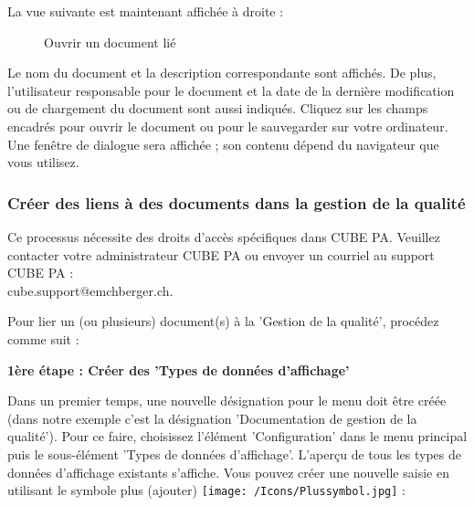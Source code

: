 \pagebreak

La vue suivante est maintenant affichée à droite :

\begin{figure}[H]
\caption{Ouvrir un document lié}
\end{figure}

Le nom du document et la description correspondante sont affichés. De plus, l'utilisateur responsable pour le document et la date de la dernière modification ou de chargement du document sont aussi indiqués. Cliquez sur les champs encadrés pour ouvrir le document ou pour le sauvegarder sur votre ordinateur. Une fenêtre de dialogue sera affichée ; son contenu dépend du navigateur que vous utilisez.

\subsubsection{Créer des liens à des documents dans la gestion de la qualité}
\label{bkm:Ref912000789}

Ce processus nécessite des droits d'accès spécifiques dans CUBE PA. Veuillez contacter votre administrateur CUBE PA ou envoyer un courriel au support CUBE PA :\\
{\color{red} cube.support@emchberger.ch}.

\vspace{\baselineskip}

Pour lier un (ou plusieurs) document(s) à la 'Gestion de la qualité', procédez comme suit :

\vspace{\baselineskip}

\textbf{1ère étape : Créer des 'Types de données d'affichage'}

Dans un premier temps, une nouvelle désignation pour le menu doit être créée (dans notre exemple c'est la désignation 'Documentation de gestion de la qualité'). Pour ce faire, choisissez l'élément 'Configuration' dans le menu principal puis le sous-élément 'Types de données d'affichage'. L'aperçu de tous les types de données d'affichage existants s'affiche. Vous pouvez créer une nouvelle saisie en utilisant le symbole plus (ajouter) \texttt{[image: /Icons/Plussymbol.jpg]}  :

